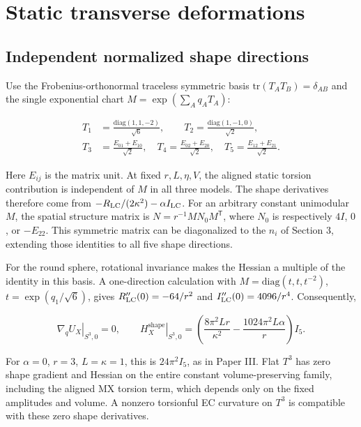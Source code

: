 \section{Static transverse deformations}

\subsection{Independent normalized shape directions}

Use the Frobenius-orthonormal traceless symmetric basis $\mathrm{tr}(T_A T_B)=\delta_{AB}$ and the single exponential chart $M=\exp(\sum_Aq_AT_A)$:

\begin{equation}\tag{H-01}\label{eq:H-01}
\begin{aligned}
T_1&=\frac{\mathrm{diag}(1,1,-2)}{\sqrt6},\qquad
T_2=\frac{\mathrm{diag}(1,-1,0)}{\sqrt2},\\
T_3&=\frac{E_{01}+E_{10}}{\sqrt2},\quad
T_4=\frac{E_{02}+E_{20}}{\sqrt2},\quad
T_5=\frac{E_{12}+E_{21}}{\sqrt2}.
\end{aligned}
\end{equation}

Here $E_{ij}$ is the matrix unit. At fixed $r,L,\eta,V$, the aligned static torsion contribution is independent of $M$ in all three models. The shape derivatives therefore come from $-R_{\rm LC}/(2\kappa^2)-\alpha I_{\rm LC}$. For an arbitrary constant unimodular $M$, the spatial structure matrix is $N=r^{-1}M N_0M^{\mathsf T}$, where $N_0$ is respectively $4I$, $0$, or $-E_{22}$. This symmetric matrix can be diagonalized to the $n_i$ of Section 3, extending those identities to all five shape directions.

For the round sphere, rotational invariance makes the Hessian a multiple of the identity in this basis. A one-direction calculation with $M=\mathrm{diag}(t,t,t^{-2})$, $t=\exp(q_1/\sqrt6)$, gives $R_{\rm LC}''(0)=-64/r^2$ and $I_{\rm LC}''(0)=4096/r^4$. Consequently,

\begin{equation}\tag{H-02}\label{eq:H-02}
\left.\nabla_qU_X\right|_{S^3,0}=0,\qquad
\left.H^{\mathrm{shape}}_X\right|_{S^3,0}
=\left(\frac{8\pi^2Lr}{\kappa^2}-\frac{1024\pi^2L\alpha}{r}\right)I_5.
\end{equation}

For $\alpha=0$, $r=3$, $L=\kappa=1$, this is $24\pi^2I_5$, as in Paper III. Flat $T^3$ has zero shape gradient and Hessian on the entire constant volume-preserving family, including the aligned MX torsion term, which depends only on the fixed amplitudes and volume. A nonzero torsionful EC curvature on $T^3$ is compatible with these zero shape derivatives.

